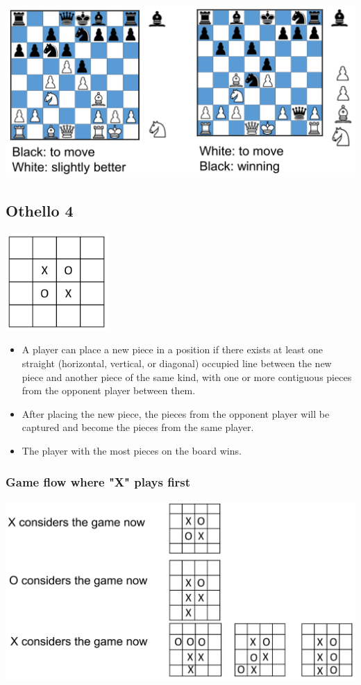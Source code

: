 \documentclass[11pt]{article}
\begin{document}
\begin{center}
\includegraphics[width=.9\linewidth]{./images/evaluation-function-chess-example.png}
\end{center}
\subsection{Othello 4}
\label{sec:org3bcaf81}
\begin{center}
\includegraphics[height=10em]{./images/othello-4-diagram.png}
\end{center}
\begin{itemize}
\item A player can place a new piece in a position if there exists at least one straight (horizontal, vertical, or diagonal) occupied line between the new piece and another piece of the same kind, with one or more contiguous pieces from the opponent player between them.
\item After placing the new piece, the pieces from the opponent player will be captured and become the pieces from the same player.
\item The player with the most pieces on the board wins.
\end{itemize}
\subsubsection{Game flow where "X" plays first}
\label{sec:org7b8cf98}
\begin{center}
\includegraphics[width=.9\linewidth]{./images/othello-4-game-flow-x-plays-first.png}
\end{center}
\end{document}
